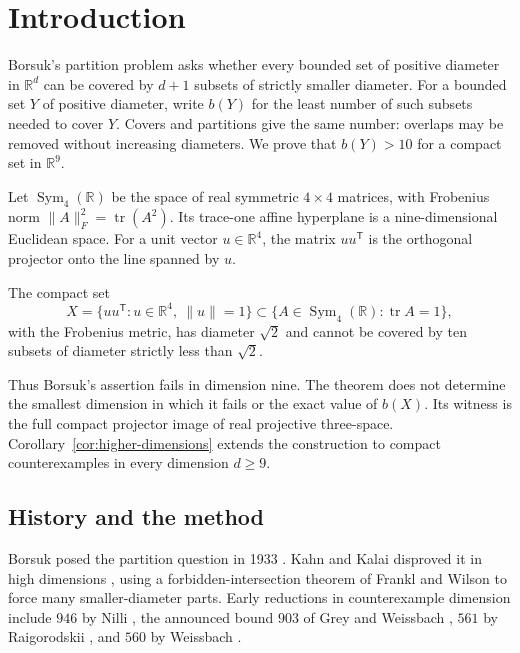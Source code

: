 \section{Introduction}
\label{sec:introduction}

Borsuk's partition problem asks whether every bounded set of positive
diameter in $\mathbb R^d$ can be covered by $d+1$ subsets of strictly
smaller diameter. For a bounded set $Y$ of positive diameter, write $b(Y)$ for the least
number of such subsets needed to cover $Y$. Covers and partitions give
the same number: overlaps may be removed without increasing diameters.
We prove that $b(Y)>10$ for a compact set in $\mathbb R^9$.

Let $\operatorname{Sym}_4(\mathbb R)$ be the space of real symmetric
$4\times4$ matrices, with Frobenius norm
$\|A\|_F^2=\operatorname{tr}(A^2)$. Its trace-one affine hyperplane is
a nine-dimensional Euclidean space. For a unit vector $u\in\mathbb R^4$,
the matrix $uu^{\mathsf T}$ is the orthogonal projector onto the line
spanned by $u$.

\begin{theorem}\label{thm:main}
The compact set
\[
 X=\{uu^{\mathsf T}:u\in\mathbb R^4,\ \|u\|=1\}
 \subset\{A\in\operatorname{Sym}_4(\mathbb R):\operatorname{tr}A=1\},
\]
with the Frobenius metric, has diameter $\sqrt2$ and cannot be covered
by ten subsets of diameter strictly less than $\sqrt2$.
\end{theorem}

Thus Borsuk's assertion fails in dimension nine. The theorem does not
determine the smallest dimension in which it fails
or the exact value of $b(X)$. Its witness is the full compact projector
image of real projective three-space. Corollary~\ref{cor:higher-dimensions}
extends the construction to compact counterexamples in every dimension
$d\geq9$.

\subsection*{History and the method}
Borsuk posed the partition question in 1933 \cite{Borsuk1933}.
Kahn and Kalai disproved it in high dimensions \cite{KahnKalai1993},
using a forbidden-intersection theorem of Frankl and Wilson
\cite{FranklWilson1981} to force many smaller-diameter parts.
Early reductions in counterexample dimension include $946$
by Nilli \cite{Nilli1994}, the announced bound $903$ of Grey and
Weissbach \cite{GreyWeissbach1997}, $561$ by Raigorodskii
\cite{Raigorodskii1997}, and $560$ by Weissbach \cite{Weissbach2000}.

